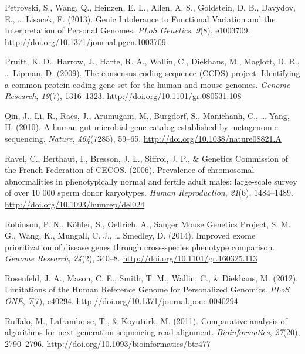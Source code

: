 \documentclass[12pt,twoside]{reedthesis}
\theoremstyle{definition}
\theoremstyle{definition}
\theoremstyle{remark}
\begin{document}
  \hypertarget{ref-Petrovski2013}{}
  Petrovski, S., Wang, Q., Heinzen, E. L., Allen, A. S., Goldstein, D. B.,
  Davydov, E., \ldots{} Lisacek, F. (2013). Genic Intolerance to
  Functional Variation and the Interpretation of Personal Genomes.
  \emph{PLoS Genetics}, \emph{9}(8), e1003709.
  \url{http://doi.org/10.1371/journal.pgen.1003709}
  
  \hypertarget{ref-Pruitt2009}{}
  Pruitt, K. D., Harrow, J., Harte, R. A., Wallin, C., Diekhans, M.,
  Maglott, D. R., \ldots{} Lipman, D. (2009). The consensus coding
  sequence (CCDS) project: Identifying a common protein-coding gene set
  for the human and mouse genomes. \emph{Genome Research}, \emph{19}(7),
  1316--1323. \url{http://doi.org/10.1101/gr.080531.108}
  
  \hypertarget{ref-Qin2010}{}
  Qin, J., Li, R., Raes, J., Arumugam, M., Burgdorf, S., Manichanh, C.,
  \ldots{} Yang, H. (2010). A human gut microbial gene catalog established
  by metagenomic sequencing. \emph{Nature}, \emph{464}(7285), 59--65.
  \url{http://doi.org/10.1038/nature08821.A}
  
  \hypertarget{ref-Ravel2006}{}
  Ravel, C., Berthaut, I., Bresson, J. L., Siffroi, J. P., \& Genetics
  Commission of the French Federation of CECOS. (2006). Prevalence of
  chromosomal abnormalities in phenotypically normal and fertile adult
  males: large-scale survey of over 10 000 sperm donor karyotypes.
  \emph{Human Reproduction}, \emph{21}(6), 1484--1489.
  \url{http://doi.org/10.1093/humrep/del024}
  
  \hypertarget{ref-Robinson2014}{}
  Robinson, P. N., Köhler, S., Oellrich, A., Sanger Mouse Genetics
  Project, S. M. G., Wang, K., Mungall, C. J., \ldots{} Smedley, D.
  (2014). Improved exome prioritization of disease genes through
  cross-species phenotype comparison. \emph{Genome Research},
  \emph{24}(2), 340--8. \url{http://doi.org/10.1101/gr.160325.113}
  
  \hypertarget{ref-Rosenfeld2012}{}
  Rosenfeld, J. A., Mason, C. E., Smith, T. M., Wallin, C., \& Diekhans,
  M. (2012). Limitations of the Human Reference Genome for Personalized
  Genomics. \emph{PLoS ONE}, \emph{7}(7), e40294.
  \url{http://doi.org/10.1371/journal.pone.0040294}
  
  \hypertarget{ref-Ruffalo2011}{}
  Ruffalo, M., Laframboise, T., \& Koyutürk, M. (2011). Comparative
  analysis of algorithms for next-generation sequencing read alignment.
  \emph{Bioinformatics}, \emph{27}(20), 2790--2796.
  \url{http://doi.org/10.1093/bioinformatics/btr477}
  
\end{document}
